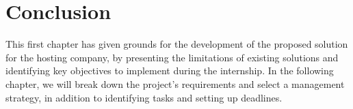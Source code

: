 \section{Conclusion}
This first chapter has given grounds for the development of the proposed solution for the hosting company, by presenting the limitations of existing solutions and identifying key objectives to implement during the internship.\newline
In the following chapter, we will break down the project's requirements and select a management strategy, in addition to identifying tasks and setting up deadlines.